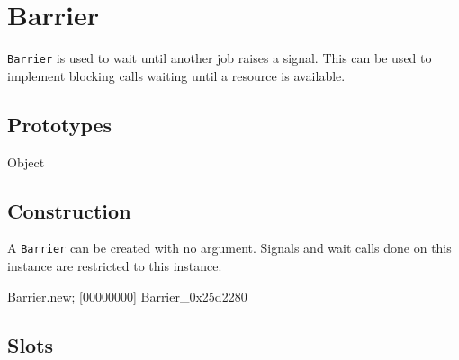 
\section{Barrier}

\lstinline|Barrier| is used to wait until another job raises a signal.
This can be used to implement blocking calls waiting until a resource
is available.

\subsection{Prototypes}

\begin{refObjects}
\item[Object]
\end{refObjects}

\subsection{Construction}

A \lstinline|Barrier| can be created with no argument.  Signals and wait
calls done on this instance are restricted to this instance.

\begin{urbiscript}[firstnumber=1]
Barrier.new;
[00000000] Barrier_0x25d2280
\end{urbiscript}

\subsection{Slots}

